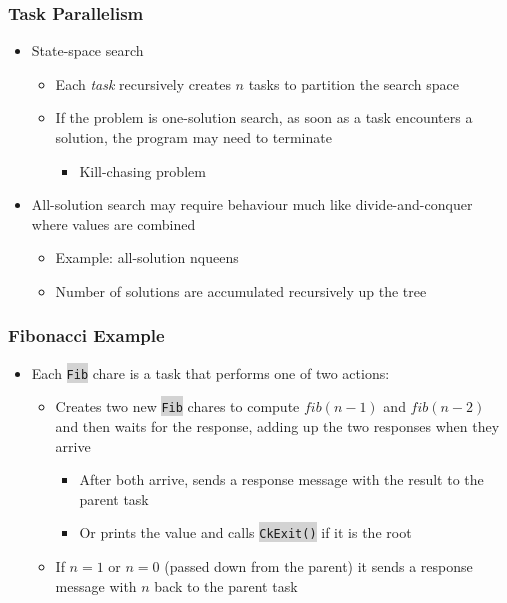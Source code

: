 \documentclass{beamer}
\newcommand{\code}[1]{\colorbox{lightgray}{\texttt{#1}}}
\begin{document}
\begin{frame}[fragile]
  \frametitle{Task Parallelism}
  \begin{itemize}
    \item State-space search
      \begin{itemize}
      \item Each \textit{task} recursively creates $n$ tasks to partition the
        search space
      \item If the problem is one-solution search, as soon as a task encounters
        a solution, the program may need to terminate
        \begin{itemize}
          \item Kill-chasing problem
        \end{itemize}
      \end{itemize}
      \item All-solution search may require behaviour much like
        divide-and-conquer where values are combined
        \begin{itemize}
        \item Example: all-solution nqueens
        \item Number of solutions are accumulated recursively up the tree
        \end{itemize}
  \end{itemize}
\end{frame}

\begin{frame}[fragile]
  \frametitle{Fibonacci Example}
  \begin{itemize}
    \item Each \code{Fib} chare is a task that performs one of two actions:
      \begin{itemize}
        \item Creates two new \code{Fib} chares to compute $fib(n-1)$ and
          $fib(n-2)$ and then waits for the response, adding up the two
          responses when they arrive
          \begin{itemize}
          \item After both arrive, sends a response message with the result to
            the parent task
          \item Or prints the value and calls \code{CkExit()} if it is the root
          \end{itemize}
        \item If $n = 1$ or $n = 0$ (passed down from the parent) it sends a
          response message with $n$ back to the parent task
      \end{itemize}
  \end{itemize}
\end{frame}
\end{document}
